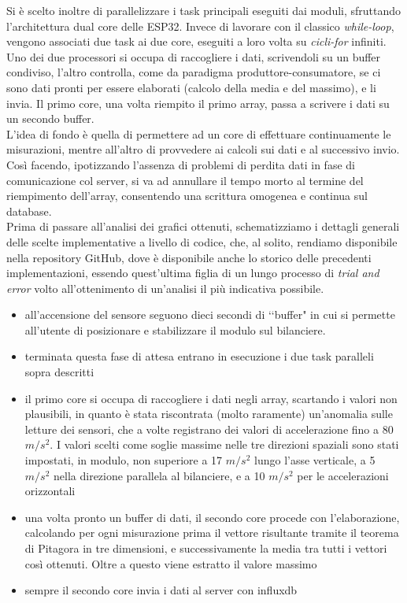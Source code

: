 \documentclass[fleqn,10pt]{SelfArx} %
\begin{document}
Si è scelto inoltre di parallelizzare i task principali eseguiti dai moduli, sfruttando l'architettura dual core delle ESP32. 
Invece di lavorare con il classico \textit{while-loop}, vengono associati due task ai due core, eseguiti a loro volta 
su \textit{cicli-for} infiniti. \\
Uno dei due processori si occupa di raccogliere i dati, scrivendoli su un buffer 
condiviso, l'altro controlla, come da paradigma produttore-consumatore, se ci sono dati pronti per essere elaborati (calcolo 
della media e del massimo), e li invia. Il primo core, una volta riempito il primo array, passa a scrivere i dati su un 
secondo buffer.\\
L'idea di fondo è quella di permettere ad un core di effettuare continuamente le misurazioni, mentre all'altro di provvedere 
ai calcoli sui dati e al successivo invio. Così facendo, ipotizzando l'assenza di problemi di perdita dati in fase di 
comunicazione col server, si va ad annullare il tempo morto al termine del riempimento dell'array,
consentendo una scrittura omogenea e continua sul database.\\

\noindent
Prima di passare all'analisi dei grafici ottenuti, schematizziamo i dettagli generali delle scelte implementative a livello 
di codice, che, al solito, rendiamo disponibile nella repository GitHub, dove è disponibile anche lo storico 
delle precedenti implementazioni, essendo quest'ultima figlia di un lungo processo di \textit{trial and error} volto 
all'ottenimento di un'analisi il più indicativa possibile.

\begin{itemize}[noitemsep] %
	\item all'accensione del sensore seguono dieci secondi di \lq\lq buffer" in cui si permette all'utente di 
	posizionare e stabilizzare il modulo sul bilanciere.
	\item terminata questa fase di attesa entrano in esecuzione i due task paralleli sopra descritti
	\item il primo core si occupa di raccogliere i dati negli array, scartando i valori non plausibili, in quanto è stata 
	riscontrata (molto raramente) un'anomalia sulle letture dei sensori, che a volte registrano dei valori di accelerazione fino a 80 $ m/s^2 $.
	I valori scelti come soglie massime nelle tre direzioni spaziali sono stati impostati, in modulo, non superiore a 17 $ m/s^2 $ lungo l'asse 
	verticale, a 5 $ m/s^2 $ nella direzione parallela al bilanciere, e a 10 $ m/s^2 $ per le accelerazioni orizzontali
	\item una volta pronto un buffer di dati, il secondo core procede con l'elaborazione, calcolando 
	per ogni misurazione prima il vettore risultante tramite il teorema di Pitagora in tre dimensioni, e successivamente 
	la media tra tutti i vettori così ottenuti. Oltre a questo viene estratto il valore massimo
	\item sempre il secondo core invia i dati al server con influxdb	
\end{itemize}
\end{document}
